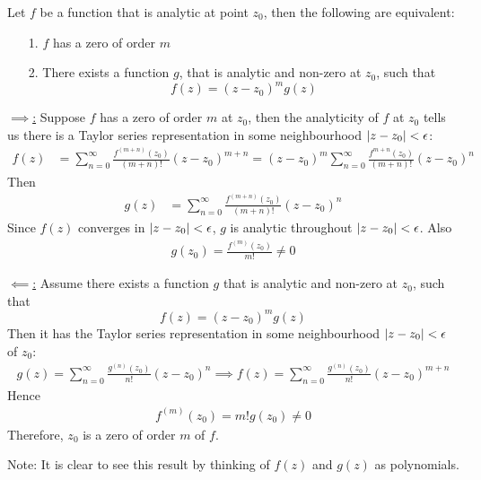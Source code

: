 \documentclass[12pt, english]{book}
\makeatletter
\renewenvironment{proof}[1][\proofname]{\par
	\pushQED{\qed}%
	\normalfont \topsep6\p@\@plus6\p@\relax
	\list{}{%
		\settowidth{\leftmargin}{\itshape\proofname:\hskip\labelsep}%
		\setlength{\labelwidth}{0pt}%
		\setlength{\itemindent}{-\leftmargin}%
	}%
	\item[\hskip\labelsep\itshape#1\@addpunct{:}]\ignorespaces
	}{ \popQED\endlist\@endpefalse}
\makeatother
\begin{document}
	\begin{theorem}
		\label{Zero of order m iff zero can be factored Theorem - Complex}
		Let \(f\) be a function that is analytic at point \(z_0\), then the following are equivalent:
		\begin{itemize}
			\item[1.] \(f\) has a zero of order \(m\)
			\item[2.] There exists a function \(g\), that is analytic and non-zero at \(z_0\), such that 
			\[f(z) = (z-z_0)^m g(z)\]
		\end{itemize}
	\end{theorem}
	\begin{proof}
		\underline{\(\implies\):} \newline
		Suppose \(f\) has a zero of order \(m\) at \(z_0\), then the analyticity of \(f\) at \(z_0\) tells us there is a Taylor series representation in some neighbourhood \(\abs{z-z_0}<\epsilon\):
		\begin{align*}
			f(z) &= \sum_{n=0}^{\infty} \frac{f^{(m+n)}(z_0)}{(m+n)!} (z-z_0)^{m+n} = (z-z_0)^m \sum_{n=0}^{\infty} \frac{f^{m+n}(z_0)}{(m+n)!}(z-z_0)^n
		\end{align*}
		Then 
		\begin{align*}
			g(z) &= \sum_{n=0}^{\infty} \frac{f^{(m+n)}(z_0)}{(m+n)!} (z-z_0)^n
		\end{align*}
		Since \(f(z)\) converges in \(\abs{z-z_0}<\epsilon\), \(g\) is analytic throughout \(\abs{z-z_0}<\epsilon\). Also
		\begin{align*}
			g(z_0) = \frac{f^{(m)}(z_0)}{m!} \neq 0
		\end{align*}
		
		\underline{\(\impliedby\):} \newline
		Assume there exists a function \(g\) that is analytic and non-zero at \(z_0\), such that 
		\[f(z) = (z-z_0)^m g(z)\]
		Then it has the Taylor series representation in some neighbourhood \(\abs{z-z_0}<\epsilon\) of \(z_0\):
		\begin{align*}
			g(z) = \sum_{n=0}^{\infty} \frac{g^{(n)}(z_0)}{n!} (z-z_0)^n
			\implies
			f(z) = \sum_{n=0}^{\infty} \frac{g^{(n)}(z_0)}{n!} (z-z_0)^{m+n}
		\end{align*}
		Hence 
		\begin{align*}
			f^{(m)}(z_0) = m! g(z_0) \neq 0
		\end{align*}
		Therefore, \(z_0\) is a zero of order \(m\) of \(f\).
	\end{proof}
	
	Note: It is clear to see this result by thinking of \(f(z)\) and \(g(z)\) as polynomials.
	
\end{document}
